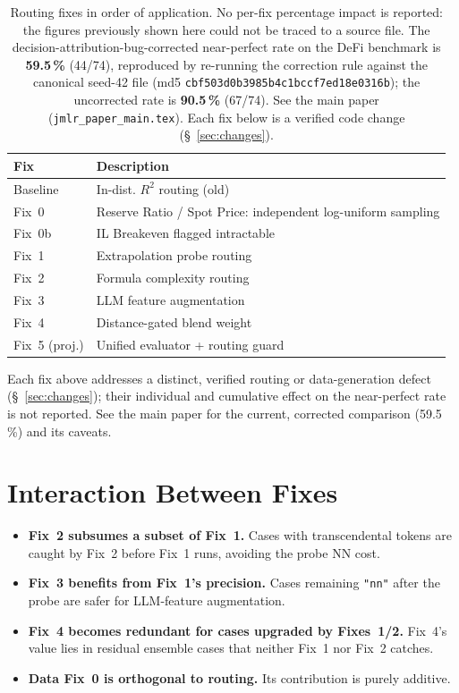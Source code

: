 \documentclass[twoside,11pt]{article}
\begin{document}
\begin{table}[h]
\centering
\caption{Routing fixes in order of application. No per-fix percentage impact is reported:
         the figures previously shown here could not be traced to a source file. The
         decision-attribution-bug-corrected near-perfect rate on the DeFi benchmark is
         \textbf{59.5\,\%} (44/74), reproduced by re-running the correction rule against the canonical
         seed-42 file (md5 \texttt{cbf503d0b3985b4c1bccf7ed18e0316b}); the uncorrected rate is
         \textbf{90.5\,\%} (67/74). See the main paper (\texttt{jmlr\_paper\_main.tex}).
         Each fix below is a verified code change (\S~\ref{sec:changes}).}
\label{tab:projected}
\begin{tabular}{ll}
\toprule
\textbf{Fix} & \textbf{Description} \\
\midrule
Baseline    & In-dist. $R^2$ routing (old) \\
Fix~0       & Reserve Ratio / Spot Price: independent log-uniform sampling \\
Fix~0b      & IL Breakeven flagged intractable \\
Fix~1       & Extrapolation probe routing \\
Fix~2       & Formula complexity routing \\
Fix~3       & LLM feature augmentation \\
Fix~4       & Distance-gated blend weight \\
Fix~5 (proj.) & Unified evaluator + routing guard \\
\bottomrule
\end{tabular}
\end{table}

Each fix above addresses a distinct, verified routing or data-generation defect
(\S~\ref{sec:changes}); their individual and cumulative effect on the near-perfect rate
is not reported. See the main paper for the current, corrected comparison (59.5\,\%) and
its caveats.


\section{Interaction Between Fixes}
\label{sec:interactions}

\begin{itemize}[leftmargin=*]
  \item \textbf{Fix~2 subsumes a subset of Fix~1.}  Cases with transcendental
    tokens are caught by Fix~2 before Fix~1 runs, avoiding the probe NN cost.
  \item \textbf{Fix~3 benefits from Fix~1's precision.}  Cases remaining
    \texttt{"nn"} after the probe are safer for LLM-feature augmentation.
  \item \textbf{Fix~4 becomes redundant for cases upgraded by Fixes~1/2.}
    Fix~4's value lies in residual ensemble cases that neither Fix~1 nor
    Fix~2 catches.
  \item \textbf{Data Fix~0 is orthogonal to routing.}  Its contribution
    is purely additive.
\end{itemize}
\end{document}
